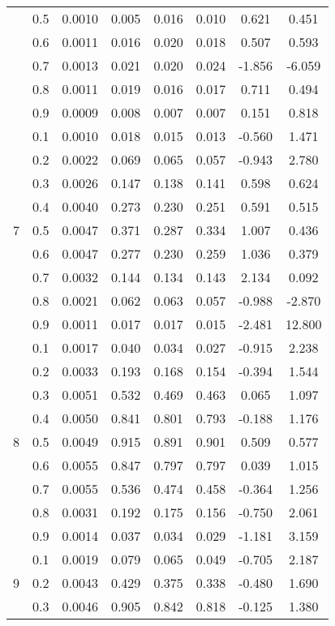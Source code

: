 \documentclass[11pt,a4paper]{report}
\begin{document}
\begin{longtable}{ | c | c || c | c | c | c | c | c | }
 & 0.5 & 0.0010 & 0.005 & 0.016 & 0.010 & 0.621 & 0.451 \\
 & 0.6 & 0.0011 & 0.016 & 0.020 & 0.018 & 0.507 & 0.593 \\
 & 0.7 & 0.0013 & 0.021 & 0.020 & 0.024 & -1.856 & -6.059 \\
 & 0.8 & 0.0011 & 0.019 & 0.016 & 0.017 & 0.711 & 0.494 \\
 & 0.9 & 0.0009 & 0.008 & 0.007 & 0.007 & 0.151 & 0.818 \\
 \hline
\multirow{9}{*}{7} & 0.1 & 0.0010 & 0.018 & 0.015 & 0.013 & -0.560 & 1.471 \\
 & 0.2 & 0.0022 & 0.069 & 0.065 & 0.057 & -0.943 & 2.780 \\
 & 0.3 & 0.0026 & 0.147 & 0.138 & 0.141 & 0.598 & 0.624 \\
 & 0.4 & 0.0040 & 0.273 & 0.230 & 0.251 & 0.591 & 0.515 \\
 & 0.5 & 0.0047 & 0.371 & 0.287 & 0.334 & 1.007 & 0.436 \\
 & 0.6 & 0.0047 & 0.277 & 0.230 & 0.259 & 1.036 & 0.379 \\
 & 0.7 & 0.0032 & 0.144 & 0.134 & 0.143 & 2.134 & 0.092 \\
 & 0.8 & 0.0021 & 0.062 & 0.063 & 0.057 & -0.988 & -2.870 \\
 & 0.9 & 0.0011 & 0.017 & 0.017 & 0.015 & -2.481 & 12.800 \\
 \hline
\multirow{9}{*}{8} & 0.1 & 0.0017 & 0.040 & 0.034 & 0.027 & -0.915 & 2.238 \\
 & 0.2 & 0.0033 & 0.193 & 0.168 & 0.154 & -0.394 & 1.544 \\
 & 0.3 & 0.0051 & 0.532 & 0.469 & 0.463 & 0.065 & 1.097 \\
 & 0.4 & 0.0050 & 0.841 & 0.801 & 0.793 & -0.188 & 1.176 \\
 & 0.5 & 0.0049 & 0.915 & 0.891 & 0.901 & 0.509 & 0.577 \\
 & 0.6 & 0.0055 & 0.847 & 0.797 & 0.797 & 0.039 & 1.015 \\
 & 0.7 & 0.0055 & 0.536 & 0.474 & 0.458 & -0.364 & 1.256 \\
 & 0.8 & 0.0031 & 0.192 & 0.175 & 0.156 & -0.750 & 2.061 \\
 & 0.9 & 0.0014 & 0.037 & 0.034 & 0.029 & -1.181 & 3.159 \\
 \hline
\multirow{9}{*}{9} & 0.1 & 0.0019 & 0.079 & 0.065 & 0.049 & -0.705 & 2.187 \\
 & 0.2 & 0.0043 & 0.429 & 0.375 & 0.338 & -0.480 & 1.690 \\
 & 0.3 & 0.0046 & 0.905 & 0.842 & 0.818 & -0.125 & 1.380 \\

\end{longtable}
\end{document}
